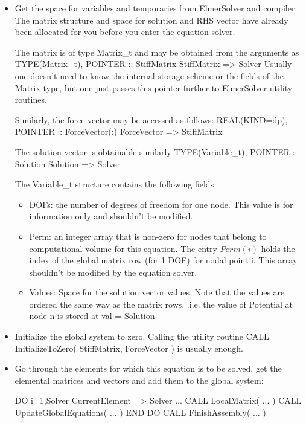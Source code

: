 \begin{itemize}
\item Get the space for variables and temporaries from ElmerSolver and compiler.
The matrix structure and space for solution and RHS vector have already been
allocated for you before you enter the equation solver.

The matrix is of type Matrix\_t and may be obtained from the arguments as
\ttbegin
TYPE(Matrix_t), POINTER :: StiffMatrix
StiffMatrix => Solver %
\ttend
Usually one doesn't need to know the internal storage scheme or the fields
of the Matrix type, but one just passes this pointer further to ElmerSolver
utility routines.

Similarly, the force vector may be accessed as follows:
\ttbegin
REAL(KIND=dp), POINTER :: ForceVector(:)
ForceVector => StiffMatrix %
\ttend

The solution vector is obtainable similarly
\ttbegin
TYPE(Variable_t), POINTER :: Solution
Solution => Solver %
\ttend

The Variable\_t structure contains the following fields
\begin{itemize}
\item DOFs: the number of degrees of freedom for one node. This value is for
information only and shouldn't be modified.
\item Perm: an integer array that is non-zero for nodes that belong
to computational volume for this equation. The entry $Perm(i)$ holds
the index of the global matrix row  (for 1 DOF) for nodal point i.
This array  shouldn't be modified by the equation solver.
\item Values: Space for the solution vector values.
Note that the values
are ordered the same way as the matrix rows, .i.e. the value of Potential at node
n is stored at
\ttbegin
  val = Solution %
\ttend
\end{itemize}


\item Initialize the global system to zero. Calling the utility routine
\ttbegin
CALL InitializeToZero( StiffMatrix, ForceVector )
\ttend
is usually enough.


\item Go through the elements for which this equation is to 
be solved, get the elemental matrices and vectors and add them to
the global system:

\ttbegin
DO i=1,Solver %
   CurrentElement => Solver %
      ...
   CALL LocalMatrix( ... )
   CALL UpdateGlobalEquations( ... )
END DO
CALL FinishAssembly( ... )
\ttend


\end{itemize}

